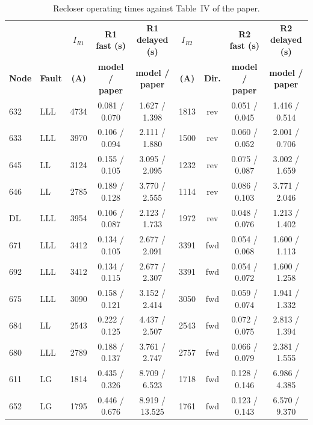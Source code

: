 \documentclass[12pt,a4paper]{article}
\begin{document}
\begin{table}[H]
\centering\footnotesize
\setlength{\tabcolsep}{4pt}
\begin{tabular}{|l|l|c|c|c|c|c|c|c|}
\hline
 & & \textbf{$I_{R1}$} & \textbf{R1 fast (s)} & \textbf{R1 delayed (s)} & \textbf{$I_{R2}$} & & \textbf{R2 fast (s)} & \textbf{R2 delayed (s)} \\
\textbf{Node} & \textbf{Fault} & \textbf{(A)} & \textbf{model / paper} & \textbf{model / paper} & \textbf{(A)} & \textbf{Dir.} & \textbf{model / paper} & \textbf{model / paper} \\ \hline
632 & LLL & 4734 & 0.081 / 0.070 & 1.627 / 1.398 & 1813 & rev & 0.051 / 0.045 & 1.416 / 0.514 \\ \hline
633 & LLL & 3970 & 0.106 / 0.094 & 2.111 / 1.880 & 1500 & rev & 0.060 / 0.052 & 2.001 / 0.706 \\ \hline
645 & LL & 3124 & 0.155 / 0.105 & 3.095 / 2.095 & 1232 & rev & 0.075 / 0.087 & 3.002 / 1.659 \\ \hline
646 & LL & 2785 & 0.189 / 0.128 & 3.770 / 2.555 & 1114 & rev & 0.086 / 0.103 & 3.771 / 2.046 \\ \hline
DL & LLL & 3954 & 0.106 / 0.087 & 2.123 / 1.733 & 1972 & rev & 0.048 / 0.076 & 1.213 / 1.402 \\ \hline
671 & LLL & 3412 & 0.134 / 0.105 & 2.677 / 2.091 & 3391 & fwd & 0.054 / 0.068 & 1.600 / 1.113 \\ \hline
692 & LLL & 3412 & 0.134 / 0.115 & 2.677 / 2.307 & 3391 & fwd & 0.054 / 0.072 & 1.600 / 1.258 \\ \hline
675 & LLL & 3090 & 0.158 / 0.121 & 3.152 / 2.414 & 3050 & fwd & 0.059 / 0.074 & 1.941 / 1.332 \\ \hline
684 & LL & 2543 & 0.222 / 0.125 & 4.437 / 2.507 & 2543 & fwd & 0.072 / 0.075 & 2.813 / 1.394 \\ \hline
680 & LLL & 2789 & 0.188 / 0.137 & 3.761 / 2.747 & 2757 & fwd & 0.066 / 0.079 & 2.381 / 1.555 \\ \hline
611 & LG & 1814 & 0.435 / 0.326 & 8.709 / 6.523 & 1718 & fwd & 0.128 / 0.146 & 6.986 / 4.385 \\ \hline
652 & LG & 1795 & 0.446 / 0.676 & 8.919 / 13.525 & 1761 & fwd & 0.123 / 0.143 & 6.570 / 9.370 \\ \hline
\end{tabular}
\caption{Recloser operating times against Table~IV of the paper.}
\label{tab:e4a}
\end{table}
\end{document}
